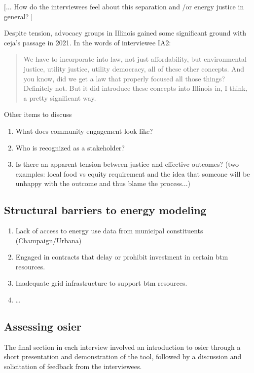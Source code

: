 [... How do the interviewees feel about this separation and /or energy justice
in general? ]

Despite tension, advocacy groups in Illinois gained some significant ground with
\ac{ceja}'s passage in 2021. In the words of interviewee IA2:

\begin{quote}
    We have to incorporate into law, not just affordability, but environmental
    justice, utility justice, utility democracy, all of these other concepts.
    And you know, did we get a law that properly focused all those things?
    Definitely not. But it did introduce these concepts into Illinois in, I
    think, a pretty significant way.
\end{quote}

Other items to discuss
\begin{enumerate}
    \item What does community engagement look like?
    \item Who is recognized as a stakeholder?
    \item Is there an apparent tension between justice and effective outcomes?
    (two examples: local food vs equity requirement and the idea that someone
    will be unhappy with the outcome and thus blame the process...)
\end{enumerate}


\subsection{Structural barriers to energy modeling}

\begin{enumerate}
    \item Lack of access to energy use data from municipal constituents
    (Champaign/Urbana)
    \item Engaged in contracts that delay or prohibit investment in certain
    \ac{btm} resources.
    \item Inadequate grid infrastructure to support \ac{btm} resources.
    \item \dots
\end{enumerate}

\subsection{Assessing \ac{osier}} 

The final section in each interview involved an introduction to \ac{osier}
through a short presentation and demonstration of the tool, followed by a
discussion and solicitation of feedback from the interviewees. 

